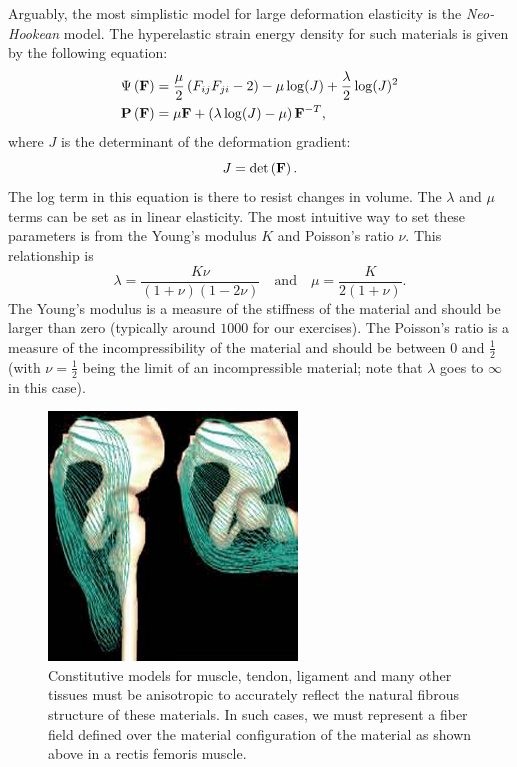 Arguably, the most simplistic model for large deformation elasticity is the \emph{Neo-Hookean} model. The hyperelastic strain energy density for such materials is given by the following equation:
\begin{align*}
\Psi \left( \mathbf{F} \right) & = \frac{\mu}{2} \left( F_{ij} F_{ji} - 2 \right) - \mu \log(J) + \frac{\lambda}{2} \log(J)^2 \\
\mathbf{P} \left( \mathbf{F} \right) & = \mu \mathbf{F} + \left( \lambda \log(J) - \mu \right) \mathbf{F}^{-T},
\end{align*}
where  $J$ is the determinant of the deformation gradient:
\begin{equation*}
J = \det \left( \mathbf{F} \right).
\end{equation*}
The log term in this equation is there to resist changes in volume. The $\lambda$ and $\mu$ terms can be set as in linear elasticity. The most intuitive way to set these parameters is from the Young's modulus $K$ and Poisson's ratio $\nu$. This relationship is
\begin{equation*}
\lambda = \frac{K \nu}{(1 + \nu)(1 - 2\nu)} \quad \text{and} \quad \mu = \frac{K}{2 (1 + \nu)}.
\end{equation*}
The Young's modulus is a measure of the stiffness of the material and should be larger than zero (typically around $1000$ for our exercises). The Poisson's ratio is a measure of the incompressibility of the material and should be between 0 and $\frac{1}{2}$ (with $\nu = \frac{1}{2}$ being the limit of an incompressible material; note that $\lambda$ goes to $\infty$ in this case).

\begin{figure}
\includegraphics[width=.5\columnwidth]{images/muscle_biomechanics_2005}
\caption{Constitutive models for muscle, tendon, ligament and many other tissues must be anisotropic to accurately reflect the natural fibrous structure of these materials. In such cases, we must represent a fiber field defined over the material configuration of the material as shown above in a rectis femoris muscle.}
\label{fig:fibers}
\end{figure}

